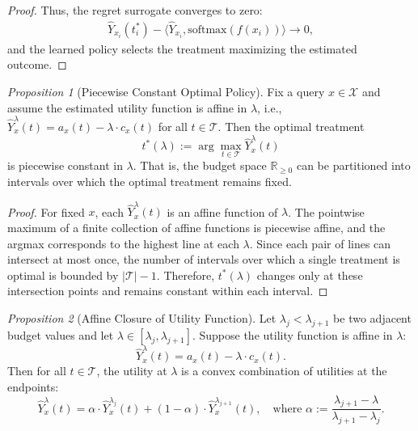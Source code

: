\documentclass{article}
\theoremstyle{remark}
\newtheorem{proposition}{Proposition}
\begin{document}
\begin{proof}
Thus, the regret surrogate converges to zero:
\begin{align}
    \hat{Y}_{x_i}(t^*_i) - \langle \hat{Y}_{x_i}, \mathrm{softmax}(f(x_i)) \rangle \to 0,
\end{align}
and the learned policy selects the treatment maximizing the estimated outcome.
\end{proof}

\begin{proposition}[Piecewise Constant Optimal Policy]
Fix a query $x \in \mathcal{X}$ and assume the estimated utility function is affine in $\lambda$, i.e., $\hat{Y}_x^\lambda(t) = a_x(t) - \lambda \cdot c_x(t)$ for all $t \in \mathcal{T}$. Then the optimal treatment
\[
t^*(\lambda) := \arg\max_{t \in \mathcal{T}} \hat{Y}_x^\lambda(t)
\]
is piecewise constant in $\lambda$. That is, the budget space $\mathbb{R}_{\geq 0}$ can be partitioned into intervals over which the optimal treatment remains fixed.
\end{proposition}

\begin{proof}
For fixed $x$, each $\hat{Y}_x^\lambda(t)$ is an affine function of $\lambda$. The pointwise maximum of a finite collection of affine functions is piecewise affine, and the argmax corresponds to the highest line at each $\lambda$. Since each pair of lines can intersect at most once, the number of intervals over which a single treatment is optimal is bounded by $|\mathcal{T}| - 1$. Therefore, $t^*(\lambda)$ changes only at these intersection points and remains constant within each interval.
\end{proof}

\begin{proposition}[Affine Closure of Utility Function]
Let $\lambda_j < \lambda_{j+1}$ be two adjacent budget values and let $\lambda \in [\lambda_j, \lambda_{j+1}]$. Suppose the utility function is affine in $\lambda$:
\[
\hat{Y}_x^\lambda(t) = a_x(t) - \lambda \cdot c_x(t).
\]
Then for all $t \in \mathcal{T}$, the utility at $\lambda$ is a convex combination of utilities at the endpoints:
\[
\hat{Y}_x^\lambda(t) = \alpha \cdot \hat{Y}_x^{\lambda_j}(t) + (1 - \alpha) \cdot \hat{Y}_x^{\lambda_{j+1}}(t),
\quad \text{where } \alpha := \frac{\lambda_{j+1} - \lambda}{\lambda_{j+1} - \lambda_j}.
\]
\end{proposition}
\end{document}
